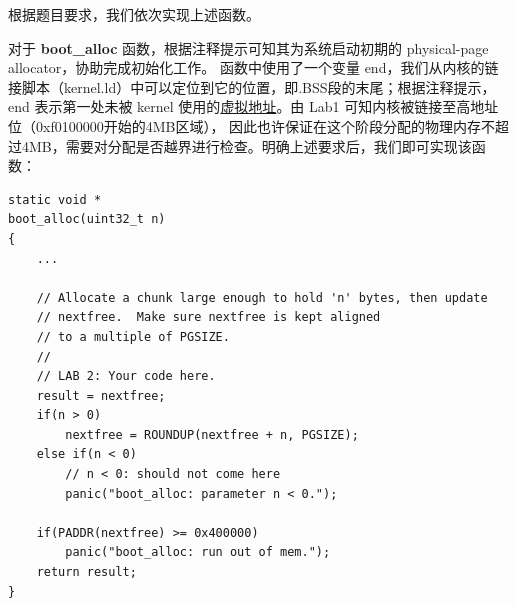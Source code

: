 \documentclass[12pt, letterpaper]{report}
\begin{document}
根据题目要求，我们依次实现上述函数。\par 
对于 \textbf{boot\_alloc} 函数，根据注释提示可知其为系统启动初期的 physical-page allocator，协助完成初始化工作。
函数中使用了一个变量 end，我们从内核的链接脚本（kernel.ld）中可以定位到它的位置，即.BSS段的末尾；根据注释提示，
end 表示第一处未被 kernel 使用的\underline{虚拟地址}。由 Lab1 可知内核被链接至高地址位（0xf0100000开始的4MB区域），
因此也许保证在这个阶段分配的物理内存不超过4MB，需要对分配是否越界进行检查。明确上述要求后，我们即可实现该函数：

\lstset{style=CStyle}
\setmainfont{Consolas}
\begin{lstlisting}
static void *
boot_alloc(uint32_t n)
{
    ...

    // Allocate a chunk large enough to hold 'n' bytes, then update
    // nextfree.  Make sure nextfree is kept aligned
    // to a multiple of PGSIZE.
    //
    // LAB 2: Your code here.
    result = nextfree;
    if(n > 0)
        nextfree = ROUNDUP(nextfree + n, PGSIZE);
    else if(n < 0)
        // n < 0: should not come here
        panic("boot_alloc: parameter n < 0.");

    if(PADDR(nextfree) >= 0x400000)
        panic("boot_alloc: run out of mem.");
    return result;
}
\end{lstlisting}
\setmainfont{Times New Roman}
\quad \par
\end{document}
